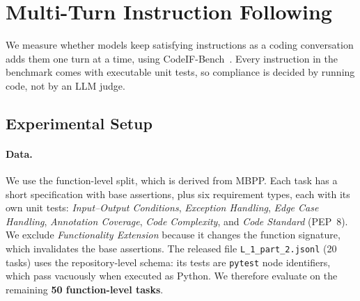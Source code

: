 %
%     
%
%
%

\section{Multi-Turn Instruction Following}
\label{app:multiturn-if}

We measure whether models keep satisfying instructions as a coding
conversation adds them one turn at a time, using
CodeIF-Bench~\citep{wang2025codeif}. Every instruction in the benchmark comes
with executable unit tests, so compliance is decided by running code, not by
an LLM judge.

\subsection{Experimental Setup}
\label{app:multiturn-if-setup}

\paragraph{Data.}
We use the function-level split, which is derived from MBPP. Each task has a
short specification with base assertions, plus six requirement types, each
with its own unit tests: \emph{Input--Output Conditions}, \emph{Exception
Handling}, \emph{Edge Case Handling}, \emph{Annotation Coverage}, \emph{Code
Complexity}, and \emph{Code Standard} (PEP~8). We exclude \emph{Functionality
Extension} because it changes the function signature, which invalidates the
base assertions. The released file \texttt{L\_1\_part\_2.jsonl} (20 tasks)
uses the repository-level schema: its tests are \texttt{pytest} node
identifiers, which pass vacuously when executed as Python. We therefore
evaluate on the remaining \textbf{50 function-level tasks}.

